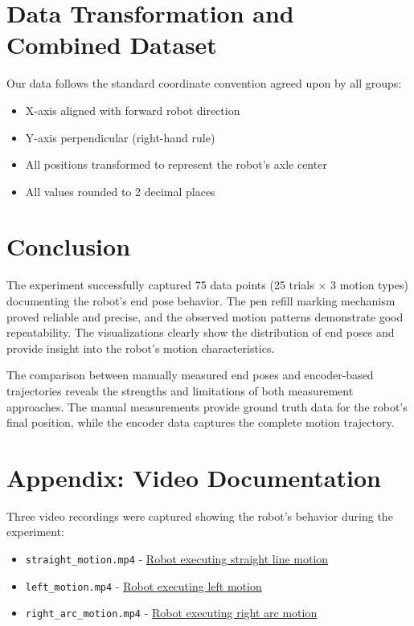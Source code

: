 \section{Data Transformation and Combined Dataset}

Our data follows the standard coordinate convention agreed upon by all groups:
\begin{itemize}
    \item X-axis aligned with forward robot direction
    \item Y-axis perpendicular (right-hand rule)
    \item All positions transformed to represent the robot's axle center
    \item All values rounded to 2 decimal places
\end{itemize}


\section{Conclusion}

The experiment successfully captured 75 data points (25 trials × 3 motion types) documenting the robot's end pose behavior. The pen refill marking mechanism proved reliable and precise, and the observed motion patterns demonstrate good repeatability. The visualizations clearly show the distribution of end poses and provide insight into the robot's motion characteristics.

The comparison between manually measured end poses and encoder-based trajectories reveals the strengths and limitations of both measurement approaches. The manual measurements provide ground truth data for the robot's final position, while the encoder data captures the complete motion trajectory.


\section{Appendix: Video Documentation}

Three video recordings were captured showing the robot's behavior during the experiment:
\begin{itemize}
    \item \texttt{straight\_motion.mp4} - \href{https://drive.google.com/file/d/1FgNvgfxEAJI85l1wr818Zc8Tj4JU2fJr/view?usp=drive_link}{Robot executing straight line motion}

    \item \texttt{left\_motion.mp4} - 
    \href{https://drive.google.com/file/d/1OQ2yL8q3jU4i1uQw93-rE6GVCyLhPzl7/view?usp=drive_link}{Robot executing left motion}

    \item \texttt{right\_arc\_motion.mp4} - 
    \href{https://drive.google.com/file/d/1vCvrGN6NnzbtScMS9WZb-VpXlUaAx0OY/view?usp=sharing}{Robot executing right arc motion}
\end{itemize}
